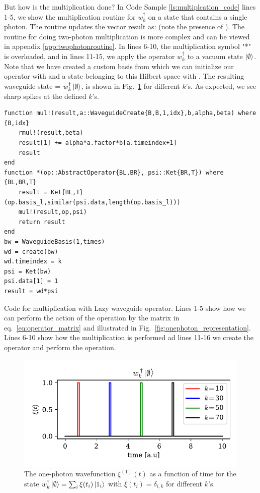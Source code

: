But how is the multiplication done? In Code Sample \ref{ls:multiplcation_code} lines 1-5, we show the multiplication routine for $w_k^\dagger$ on a state that contains a single photon. The routine updates the vector result as:  (note the presence of ). The routine for doing two-photon multiplication is more complex and can be viewed in appendix \ref{app:twophotonroutine}. In lines 6-10, the multiplication symbol "*" is overloaded, and in lines 11-15, we apply the operator $w_k^\dagger$ to a vacuum state $\ket{\emptyset}$. Note that we have created a custom basis  from which we can initialize our operator with  and a state belonging to this Hilbert space with . The resulting waveguide state  = $w_k^\dagger \ket{\emptyset}$, is shown in Fig.~\ref{fig:creationoperator} for different $k$'s. As expected, we see sharp spikes at the defined $k$'s.  
\begin{listing}[H]
\begin{verbatim}
function mul!(result,a::WaveguideCreate{B,B,1,idx},b,alpha,beta) where {B,idx}
    rmul!(result,beta)
    result[1] += alpha*a.factor*b[a.timeindex+1]
    result
end
function *(op::AbstractOperator{BL,BR}, psi::Ket{BR,T}) where {BL,BR,T}
    result = Ket{BL,T}(op.basis_l,similar(psi.data,length(op.basis_l)))
    mul!(result,op,psi)
    return result
end
bw = WaveguideBasis(1,times)
wd = create(bw)
wd.timeindex = k
psi = Ket(bw)
psi.data[1] = 1
result = wd*psi
\end{verbatim}
\caption{Code for multiplication with Lazy waveguide operator. Lines 1-5 show how we can perform the action of the operation by the matrix in eq.~\eqref{eq:operator_matrix} and illustrated in Fig.~\ref{fig:onephoton_representation}. Lines 6-10 show how the multiplication is performed ad lines 11-16 we create the operator and perform the operation. }
\label{ls:multiplcation_code}
\end{listing}


\begin{figure}
    \centering
    \includegraphics[width=0.6\linewidth]{figures/creationoperation.pdf}
    \caption{The one-photon wavefunction $\xi^{(1)}(t)$ as a function of time for the state $w_k^\dagger \ket{\emptyset} = \sum_i \xi(t_i) \ket{1_i}$ with $\xi(t_i) = \delta_{i,k}$ for different $k$'s. }
    \label{fig:creationoperator}
\end{figure}


